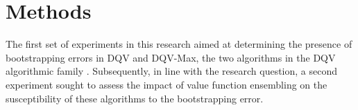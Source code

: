 \section{Methods}\label{sec:methods}
The first set of experiments in this research aimed at determining the
presence of bootstrapping errors in DQV and DQV-Max, the two
algorithms in the DQV algorithmic family \citep{sabatelli2020deep}.
Subsequently, in line with the research question, a second experiment
sought to assess the impact of value function ensembling on the
susceptibility of these algorithms to the bootstrapping error.

